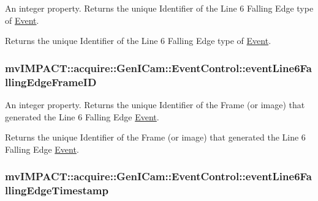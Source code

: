 An integer property. Returns the unique Identifier of the Line 6 Falling Edge type of \hyperlink{classmv_i_m_p_a_c_t_1_1acquire_1_1_event}{Event}. 

Returns the unique Identifier of the Line 6 Falling Edge type of \hyperlink{classmv_i_m_p_a_c_t_1_1acquire_1_1_event}{Event}. \hypertarget{classmv_i_m_p_a_c_t_1_1acquire_1_1_gen_i_cam_1_1_event_control_a89287d21eea126d6c76a71d1d1589f6d}{
\subsubsection[{event\+Line6\+Falling\+Edge\+Frame\+I\+D}]{ mv\+I\+M\+P\+A\+C\+T\+::acquire\+::\+Gen\+I\+Cam\+::\+Event\+Control\+::event\+Line6\+Falling\+Edge\+Frame\+I\+D}}\label{classmv_i_m_p_a_c_t_1_1acquire_1_1_gen_i_cam_1_1_event_control_a89287d21eea126d6c76a71d1d1589f6d}


An integer property. Returns the unique Identifier of the Frame (or image) that generated the Line 6 Falling Edge \hyperlink{classmv_i_m_p_a_c_t_1_1acquire_1_1_event}{Event}. 

Returns the unique Identifier of the Frame (or image) that generated the Line 6 Falling Edge \hyperlink{classmv_i_m_p_a_c_t_1_1acquire_1_1_event}{Event}. \hypertarget{classmv_i_m_p_a_c_t_1_1acquire_1_1_gen_i_cam_1_1_event_control_a1801adf79e6c1422d940ad0235e13ad2}{
\subsubsection[{event\+Line6\+Falling\+Edge\+Timestamp}]{ mv\+I\+M\+P\+A\+C\+T\+::acquire\+::\+Gen\+I\+Cam\+::\+Event\+Control\+::event\+Line6\+Falling\+Edge\+Timestamp}}\label{classmv_i_m_p_a_c_t_1_1acquire_1_1_gen_i_cam_1_1_event_control_a1801adf79e6c1422d940ad0235e13ad2}



